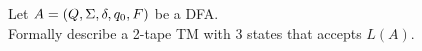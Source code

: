 Let $A = (Q, \Sigma, \delta, q_0, F)$ be a DFA. \\
Formally describe a 2-tape TM with 3 states that accepts $L(A)$.

